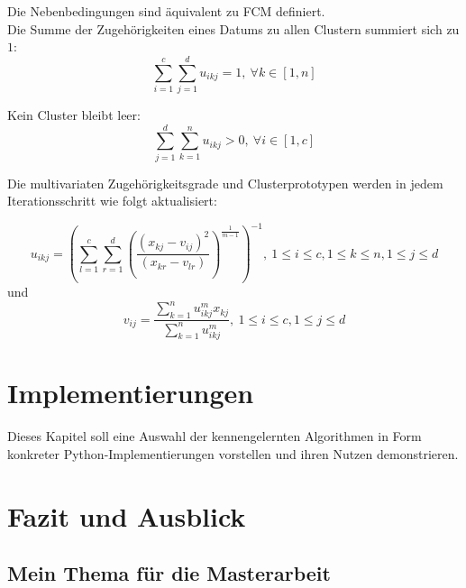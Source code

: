 \documentclass[11pt,ceqn]{book}
\begin{document}
Die Nebenbedingungen sind äquivalent zu FCM definiert.\\
Die Summe der Zugehörigkeiten eines Datums zu allen Clustern summiert sich zu $1$:
$$\sum_{i=1}^c\sum_{j=1}^d u_{ikj}= 1,\ \forall k\in \left[1,n\right]$$

Kein Cluster bleibt leer:
$$\sum_{j=1}^d\sum_{k=1}^n u_{ikj}> 0,\ \forall i\in \left[1,c\right]$$ 

Die multivariaten Zugehörigkeitsgrade und Clusterprototypen werden
in jedem Iterationsschritt wie folgt aktualisiert:

$$u_{ikj} = \left(\sum_{l=1}^c \sum_{r=1}^d \left(\frac{(x_{kj}-v_{ij})^2}{(x_{kr}-v_{lr})}\right)^{\frac{1}{m-1}}\right)^{-1},\ 1\leqslant i \leqslant c,1\leqslant k\leqslant n, 1\leqslant j\leqslant d$$
und
$$v_{ij} = \frac{\sum\limits_{k=1}^n u_{ikj}^m x_{kj}}{\sum\limits_{k=1}^n u_{ikj}^m},\ 1\leqslant i\leqslant c,1\leqslant j\leqslant d$$

\chapter{Implementierungen}

Dieses Kapitel soll eine Auswahl der kennengelernten Algorithmen in Form konkreter Python-Implementierungen vorstellen und ihren Nutzen demonstrieren.




\chapter{Fazit und Ausblick}
\section{Mein Thema für die Masterarbeit}


\printbibliography
\end{document}
